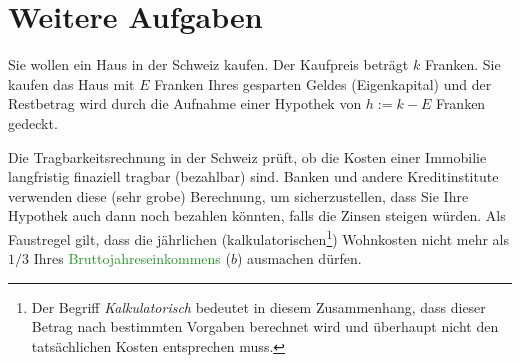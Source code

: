 \section{Weitere Aufgaben}
\begin{myexercise}\label{myexercise:kaufpreis_haus}
	Sie wollen ein Haus in der Schweiz kaufen. Der Kaufpreis beträgt $k$ Franken. Sie kaufen das Haus mit $E$ Franken Ihres gesparten Geldes (Eigenkapital) und der Restbetrag wird durch die Aufnahme einer Hypothek von $h := k - E$ Franken gedeckt.

	Die Tragbarkeitsrechnung in der Schweiz prüft, ob die Kosten einer Immobilie langfristig finaziell tragbar (bezahlbar) sind. Banken und andere Kreditinstitute verwenden diese (sehr grobe) Berechnung, um sicherzustellen, dass Sie Ihre Hypothek auch dann noch bezahlen könnten, falls die Zinsen steigen würden. Als Faustregel gilt, dass die jährlichen (kalkulatorischen\footnote{Der Begriff \textit{Kalkulatorisch} bedeutet in diesem Zusammenhang, dass dieser Betrag nach bestimmten Vorgaben berechnet wird und überhaupt nicht den tatsächlichen Kosten entsprechen muss.}) Wohnkosten nicht mehr als $1 / 3$ Ihres \textcolor{ForestGreen}{Bruttojahreseinkommens} ($b$) ausmachen dürfen.


\end{myexercise}
